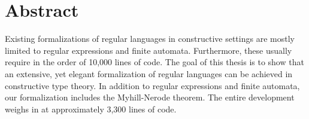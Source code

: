 \chapter*{Abstract}
Existing formalizations of regular languages in constructive settings are mostly limited to regular expressions and finite automata. 
Furthermore, these usually require in the order of 10,000 lines of code. %
The goal of this thesis is to show that an extensive, yet elegant formalization of regular languages can be achieved in constructive type theory. 
In addition to regular expressions and finite automata, our formalization includes the Myhill-Nerode theorem. 
The entire development weighs in at approximately 3,300 lines of code. %
